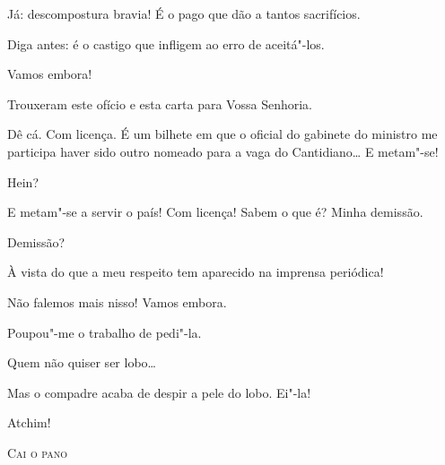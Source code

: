  Já: descompostura bravia! É o pago que dão a tantos
sacrifícios.

 Diga antes: é o castigo que infligem ao erro de aceitá"-los.

  Vamos embora! 




  Trouxeram este ofício e esta carta
para Vossa Senhoria. 

 Dê cá.  Com licença. 
É um bilhete em que o oficial do gabinete do ministro
me participa haver sido outro nomeado para a vaga do Cantidiano\ldots{} E
metam"-se!

 Hein?

 E metam"-se a servir o país!  Com
licença!  Sabem o que
é? Minha demissão.

 Demissão?

 À vista do que a meu respeito tem aparecido na imprensa
periódica!

 Não falemos mais nisso! Vamos embora.

 Poupou"-me o trabalho de pedi"-la.

 Quem não quiser ser lobo\ldots{}

 Mas o compadre acaba de despir a pele do
lobo.  Ei"-la!

 Atchim! 

\vspace{1cm}

\begin{center}
\textsc{Cai o pano}
\end{center}


